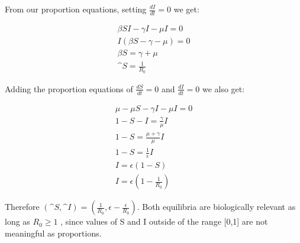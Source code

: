 From our proportion equations, setting $\frac{dI}{dt} = 0$ we get:

\begin{align*}
	\beta SI - \gamma I - \mu I = 0 \\
	I (\beta S - \gamma - \mu ) = 0 \\
	\beta S =  \gamma + \mu \\
	\^{S} = \frac{1}{R_{0}}
\end{align*}

Adding the proportion equations of $\frac{dS}{dt} = 0$ and $\frac{dI}{dt} = 0$ we also get:

\begin{align*}
	\mu - \mu S - \gamma I - \mu I = 0 \\
	1 - S - I = \frac{\gamma}{\mu} I \\
	1 - S = \frac{\mu + \gamma}{\mu} I \\
	1 - S = \frac{1}{\epsilon} I \\
	I = \epsilon (1 - S) \\
	I = \epsilon (1 - \frac{1}{R_{0}})
\end{align*}

Therefore $(\^{S}, \^{I}) = (\frac{1}{R_{0}}, \epsilon - \frac{\epsilon}{{R_{0}}})$. Both equilibria are biologically relevant as long as $R_{0} \geq 1$ , since values of S and I outside of the range [0,1] are not meaningful as proportions.
